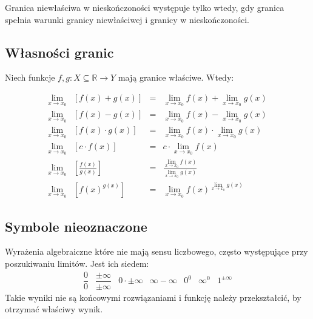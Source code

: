 \documentclass[14pt,a4paper]{extarticle}
\begin{document}
\noindent Granica niewłaściwa w nieskończoności występuje tylko wtedy, gdy granica spełnia warunki granicy niewłaściwej i granicy w nieskończoności.\\

\subsection{Własności granic}
\noindent Niech funkcje $f,g :X \subseteq \mathbb{R} \rightarrow Y$ mają granice właściwe. Wtedy:

{%

\renewcommand{\arraystretch}{2}

\begin{equation*}
\begin{array}{rccc}
   \displaystyle\lim_{x \to x_{0}} & \displaystyle[f(x) + g(x)] & = & \displaystyle\lim_{x \to x_{0}}f(x) + \lim_{x \to x_{0}}g(x) \\
   \displaystyle\lim_{x \to x_{0}} & \displaystyle[f(x) - g(x)] & = & \displaystyle\lim_{x \to x_{0}}f(x) - \lim_{x \to x_{0}}g(x) \\
   \displaystyle\lim_{x \to x_{0}} & \displaystyle[f(x)\cdot g(x)] & = & \displaystyle\lim_{x \to x_{0}}f(x) \cdot \lim_{x \to x_{0}}g(x) \\
   \displaystyle\lim_{x \to x_{0}} & \displaystyle[c \cdot f(x)] & = & \displaystyle c \cdot \lim_{x \to x_{0}}f(x) \\
   \displaystyle\lim_{x \to x_{0}} & \displaystyle\left[\frac{f(x)}{g(x)}\right] & = & \displaystyle\frac{\displaystyle\lim_{x \to x_{0}}f(x)}{\displaystyle\lim_{x \to x_{0}}g(x)} \\
   \displaystyle\lim_{x \to x_{0}} & \displaystyle [f(x)^{g(x)}]& = & \displaystyle \lim_{x \to x_{0}}f(x)^{\lim\limits_{x \to x_{0}}g(x)}
\end{array}   
\end{equation*}

}%

\subsection{Symbole nieoznaczone}
\noindent Wyrażenia algebraiczne które nie mają sensu liczbowego, często występujące przy poszukiwaniu limitów.
Jest ich siedem:
\begin{equation*}
   \begin{array}{ccccccc}
      \dfrac{0}{0} & \dfrac{\pm\infty}{\pm\infty} & 0 \cdot \pm\infty & \infty - \infty & 0^{0} & \infty^{0} & 1^{\pm\infty}
   \end{array}
\end{equation*}
Takie wyniki nie są końcowymi rozwiązaniami i funkcję należy przekształcić, by otrzymać właściwy wynik.
\end{document}
